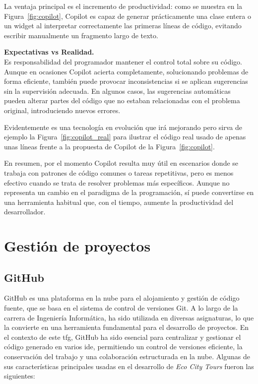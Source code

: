 	La ventaja principal es el incremento de productividad: como se muestra en la Figura~\ref{fig:copilot}, Copilot es capaz de generar prácticamente una clase entera o un widget al interpretar correctamente las primeras líneas de código, evitando escribir manualmente un fragmento largo de texto.
	
	\textbf{Expectativas vs Realidad.}\\
	Es responsabilidad del programador mantener el control total sobre su código. Aunque en ocasiones Copilot acierta completamente, solucionando problemas de forma eficiente, también puede provocar inconsistencias si se aplican sugerencias sin la supervisión adecuada. En algunos casos, las sugerencias automáticas pueden alterar partes del código que no estaban relacionadas con el problema original, introduciendo nuevos errores.
	
	Evidentemente es una tecnología en evolución que irá mejorando pero sirva de ejemplo la Figura~\ref{fig:copilot_real} para ilustrar el código real usado de apenas unas líneas frente a la propuesta de Copilot de la Figura~\ref{fig:copilot}.
	
	En resumen, por el momento Copilot resulta muy útil en escenarios donde se trabaja con patrones de código comunes o tareas repetitivas, pero es menos efectivo cuando se trata de resolver problemas más específicos. Aunque no representa un cambio en el paradigma de la programación, sí puede convertirse en una herramienta habitual que, con el tiempo, aumente la productividad del desarrollador.

\section{Gestión de proyectos}
	\subsection{GitHub}
	GitHub es una plataforma en la nube para el alojamiento y gestión de código fuente, que se basa en el sistema de control de versiones Git. A lo largo de la carrera de Ingeniería Informática, ha sido utilizada en diversas asignaturas, lo que la convierte en una herramienta fundamental para el desarrollo de proyectos. En el contexto de este \acrshort{tfg}, GitHub ha sido esencial para centralizar y gestionar el código generado en varios \acrshort{ide}, permitiendo un control de versiones eficiente, la conservación del trabajo y una colaboración estructurada en la nube. Algunas de sus características principales usadas en el desarrollo de \textit{Eco City Tours} fueron las siguientes: 
	
